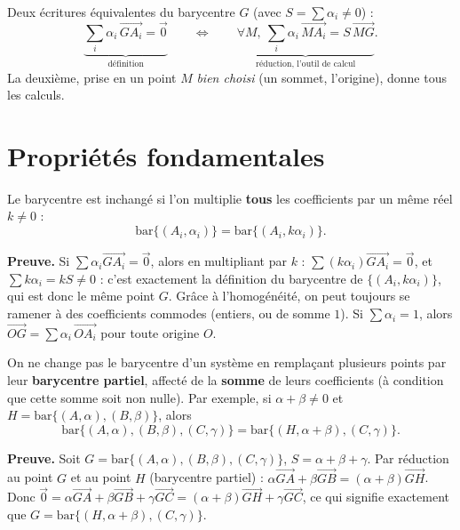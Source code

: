 \begin{aretenir}
Deux écritures équivalentes du barycentre $G$ (avec $S=\sum\alpha_i\neq0$) :
\[
\underbrace{\sum_i\alpha_i\,\overrightarrow{GA_i}=\vec0}_{\text{définition}}
\qquad\Longleftrightarrow\qquad
\underbrace{\forall M,\ \sum_i\alpha_i\,\overrightarrow{MA_i}=S\,\overrightarrow{MG}}_{\text{réduction, l'outil de calcul}}.
\]
La deuxième, prise en un point $M$ \emph{bien choisi} (un sommet, l'origine), donne tous les calculs.
\end{aretenir}

\section{Propriétés fondamentales}

\begin{propriete}[Homogénéité]
Le barycentre est inchangé si l'on multiplie \textbf{tous} les coefficients par un même réel $k\neq0$ :
\[
\mathrm{bar}\{(A_i,\alpha_i)\}=\mathrm{bar}\{(A_i,k\alpha_i)\}.
\]
\end{propriete}

\begin{remarque}
\textbf{Preuve.} Si $\sum\alpha_i\overrightarrow{GA_i}=\vec0$, alors en multipliant par $k$ :
$\sum (k\alpha_i)\overrightarrow{GA_i}=\vec0$, et $\sum k\alpha_i=kS\neq0$ : c'est exactement
la définition du barycentre de $\{(A_i,k\alpha_i)\}$, qui est donc le même point $G$.
Grâce à l'homogénéité, on peut toujours se ramener à des coefficients commodes (entiers, ou
de somme $1$). Si $\sum\alpha_i=1$, alors $\overrightarrow{OG}=\sum\alpha_i\,\overrightarrow{OA_i}$ pour toute origine $O$.
\end{remarque}

\begin{theoreme}
On ne change pas le barycentre d'un système en remplaçant plusieurs points par leur \textbf{barycentre partiel}, affecté de la \textbf{somme} de leurs coefficients (à condition que cette somme soit non nulle). Par exemple, si $\alpha+\beta\neq0$ et $H=\mathrm{bar}\{(A,\alpha),(B,\beta)\}$, alors
\[
\mathrm{bar}\{(A,\alpha),(B,\beta),(C,\gamma)\}=\mathrm{bar}\{(H,\alpha+\beta),(C,\gamma)\}.
\]
\end{theoreme}

\begin{remarque}
\textbf{Preuve.} Soit $G=\mathrm{bar}\{(A,\alpha),(B,\beta),(C,\gamma)\}$, $S=\alpha+\beta+\gamma$.
Par réduction au point $G$ et au point $H$ (barycentre partiel) :
$\alpha\overrightarrow{GA}+\beta\overrightarrow{GB}=(\alpha+\beta)\overrightarrow{GH}$.
Donc $\vec0=\alpha\overrightarrow{GA}+\beta\overrightarrow{GB}+\gamma\overrightarrow{GC}
=(\alpha+\beta)\overrightarrow{GH}+\gamma\overrightarrow{GC}$, ce qui signifie exactement que
$G=\mathrm{bar}\{(H,\alpha+\beta),(C,\gamma)\}$.
\end{remarque}

